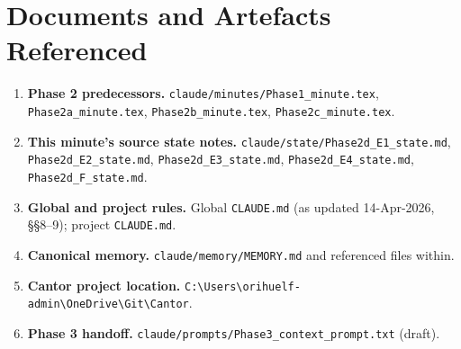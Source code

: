 \documentclass[11pt,a4paper]{article}
\begin{document}
\section{Documents and Artefacts Referenced}

\begin{enumerate}
    \item \textbf{Phase 2 predecessors.} \texttt{claude/minutes/Phase1\_minute.tex}, \texttt{Phase2a\_minute.tex}, \texttt{Phase2b\_minute.tex}, \texttt{Phase2c\_minute.tex}.
    \item \textbf{This minute's source state notes.} \texttt{claude/state/Phase2d\_E1\_state.md}, \texttt{Phase2d\_E2\_state.md}, \texttt{Phase2d\_E3\_state.md}, \texttt{Phase2d\_E4\_state.md}, \texttt{Phase2d\_F\_state.md}.
    \item \textbf{Global and project rules.} Global \texttt{CLAUDE.md} (as updated 14-Apr-2026, §§8--9); project \texttt{CLAUDE.md}.
    \item \textbf{Canonical memory.} \texttt{claude/memory/MEMORY.md} and referenced files within.
    \item \textbf{Cantor project location.} \texttt{C:\textbackslash Users\textbackslash orihuelf-admin\textbackslash OneDrive\textbackslash Git\textbackslash Cantor}.
    \item \textbf{Phase 3 handoff.} \texttt{claude/prompts/Phase3\_context\_prompt.txt} (draft).
\end{enumerate}
\end{document}
